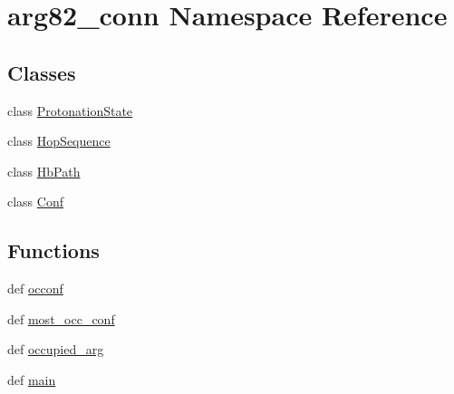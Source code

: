 \hypertarget{namespacearg82__conn}{\section{arg82\-\_\-conn Namespace Reference}
\label{namespacearg82__conn}
}
\subsection*{Classes}
\begin{DoxyCompactItemize}
\item 
class \hyperlink{classarg82__conn_1_1_protonation_state}{Protonation\-State}
\item 
class \hyperlink{classarg82__conn_1_1_hop_sequence}{Hop\-Sequence}
\item 
class \hyperlink{classarg82__conn_1_1_hb_path}{Hb\-Path}
\item 
class \hyperlink{classarg82__conn_1_1_conf}{Conf}
\end{DoxyCompactItemize}
\subsection*{Functions}
\begin{DoxyCompactItemize}
\item 
def \hyperlink{namespacearg82__conn_a0e915959a01aeb1a5af59191966b9ac8}{occonf}
\item 
def \hyperlink{namespacearg82__conn_af60ebd9bfc139eee093b86579bc02e3a}{most\-\_\-occ\-\_\-conf}
\item 
def \hyperlink{namespacearg82__conn_aa2a85f84b25b079994c07aae005513f5}{occupied\-\_\-arg}
\item 
def \hyperlink{namespacearg82__conn_a654bc7307bad1f2c60c8d9c8b946f07f}{main}
\end{DoxyCompactItemize}
